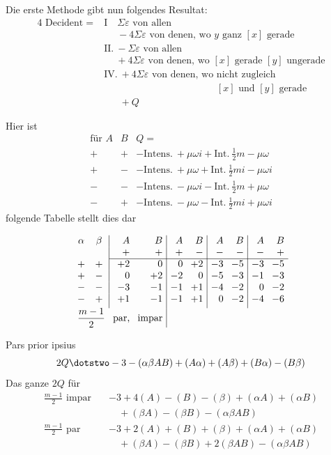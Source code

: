 Die erste Methode gibt nun folgendes Resultat:
\[
\begin{aligned}
4\text{ Decident}={}&\mathrm{I}\quad\Sigma\varepsilon\text{ von allen}\\
&\phantom{\mathrm{I}\quad}{-}4\Sigma\varepsilon\text{ von denen, wo }y\text{ ganz }[x]\text{ gerade}\\[3pt]
&\mathrm{II.}\ {-}\Sigma\varepsilon\text{ von allen}\\
&\phantom{\mathrm{II.}\ }{+}4\Sigma\varepsilon\text{ von denen, wo }[x]\text{ gerade }[y]\text{ ungerade}\\[3pt]
&\mathrm{IV.}\ {+}4\Sigma\varepsilon\text{ von denen, wo nicht zugleich}\\
&\phantom{\mathrm{IV.}\ {+}4\Sigma\varepsilon\text{ von denen, wo }}[x]\text{ und }[y]\text{ gerade}\\
&\phantom{\mathrm{IV.}\ }{+}Q
\end{aligned}
\]

Hier ist
\[
\begin{array}{cc|l}
\text{für }A&B&Q=\\
+&+&-\text{Intens.}\ {+}\mu\omega i+\text{Int.}\ \frac12m-\mu\omega\\
+&-&-\text{Intens.}\ {+}\mu\omega+\text{Int.}\ \frac12mi-\mu\omega i\\
-&-&-\text{Intens.}\ {-}\mu\omega i-\text{Int.}\ \frac12m+\mu\omega\\
-&+&-\text{Intens.}\ {-}\mu\omega-\text{Int.}\ \frac12mi+\mu\omega i
\end{array}
\]
folgende Tabelle stellt dies dar

\[
\setlength{\arraycolsep}{4pt}
\begin{array}{cc|rr|rr|rr|rr}
\alpha&\beta& A&B&A&B&A&B&A&B\\
&&+&+&+&-&-&-&-&+\\ \cline{3-10}
+&+&+2&0&0&+2&-3&-5&-3&-5\\
+&-&0&+2&-2&0&-5&-3&-1&-3\\
-&-&-3&-1&-1&+1&-4&-2&0&-2\\
-&+&+1&-1&-1&+1&0&-2&-4&-6\\[3pt]
\multicolumn{2}{r}{\dfrac{m-1}{2}}&\text{par,}&\text{impar}&\multicolumn{6}{c}{}
\end{array}
\]

Pars prior ipsius
\[
2Q\dotstwo -3-(\alpha\beta AB)+(A\alpha)+(A\beta)+(B\alpha)-(B\beta)
\]
Das ganze $2Q$ für
\[
\begin{aligned}
\frac{m-1}{2}\text{ impar}\quad&-3+4(A)-(B)-(\beta)+(\alpha A)+(\alpha B)\\
&\quad +(\beta A)-(\beta B)-(\alpha\beta AB)\\[3pt]
\frac{m-1}{2}\text{ par}\quad&-3+2(A)+(B)+(\beta)+(\alpha A)+(\alpha B)\\
&\quad +(\beta A)-(\beta B)+2(\beta AB)-(\alpha\beta AB)
\end{aligned}
\]

